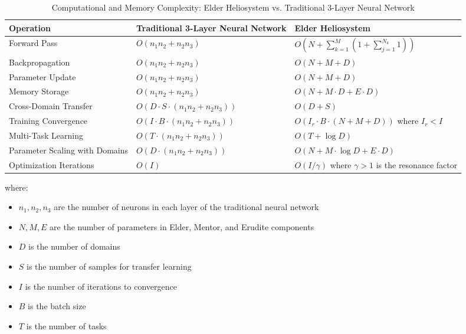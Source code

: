 \begin{table}[h]
\centering
\small
\caption{Computational and Memory Complexity: Elder Heliosystem vs. Traditional 3-Layer Neural Network}
\label{tab:nn_comparison}
\begin{tabular}{|p{3cm}|p{5.5cm}|p{5.5cm}|}
\hline
\textbf{Operation} & \textbf{Traditional 3-Layer Neural Network} & \textbf{Elder Heliosystem} \\
\hline
Forward Pass & $O(n_1 n_2 + n_2 n_3)$ & $O(N + \sum_{k=1}^M (1 + \sum_{j=1}^{N_k} 1))$ \\
\hline
Backpropagation & $O(n_1 n_2 + n_2 n_3)$ & $O(N + M + D)$ \\
\hline
Parameter Update & $O(n_1 n_2 + n_2 n_3)$ & $O(N + M + D)$ \\
\hline
Memory Storage & $O(n_1 n_2 + n_2 n_3)$ & $O(N + M \cdot D + E \cdot D)$ \\
\hline
Cross-Domain Transfer & $O(D \cdot S \cdot (n_1 n_2 + n_2 n_3))$ & $O(D + S)$ \\
\hline
Training Convergence & $O(I \cdot B \cdot (n_1 n_2 + n_2 n_3))$ & $O(I_r \cdot B \cdot (N + M + D))$ where $I_r < I$ \\
\hline
Multi-Task Learning & $O(T \cdot (n_1 n_2 + n_2 n_3))$ & $O(T + \log D)$ \\
\hline
Parameter Scaling with Domains & $O(D \cdot (n_1 n_2 + n_2 n_3))$ & $O(N + M \cdot \log D + E \cdot D)$ \\
\hline
Optimization Iterations & $O(I)$ & $O(I / \gamma)$ where $\gamma > 1$ is the resonance factor \\
\hline
\end{tabular}
\end{table}

\noindent where:
\begin{itemize}
    \item $n_1, n_2, n_3$ are the number of neurons in each layer of the traditional neural network
    \item $N, M, E$ are the number of parameters in Elder, Mentor, and Erudite components
    \item $D$ is the number of domains
    \item $S$ is the number of samples for transfer learning
    \item $I$ is the number of iterations to convergence
    \item $B$ is the batch size
    \item $T$ is the number of tasks
\end{itemize}

